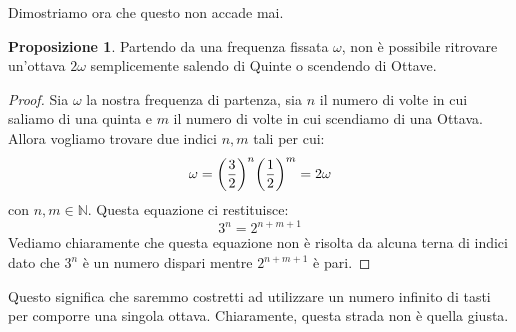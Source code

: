 \documentclass[12pt,a4paper]{book}
\theoremstyle{definition}
\theoremstyle{Theorem}
\newtheorem{Prop}[Def]{Proposizione}
\theoremstyle{definition}
\theoremstyle{definition}
\theoremstyle{definition}
\begin{document}
	Dimostriamo ora che questo non accade mai.
	\\
	 \begin{Prop}
	 	Partendo da una frequenza fissata $\omega$, non è possibile ritrovare un'ottava $2\omega$ semplicemente salendo di Quinte o scendendo di Ottave.
	 \end{Prop}
	 \begin{proof}
	 	Sia $\omega$ la nostra frequenza di partenza, sia $n$ il numero di volte in cui saliamo di una quinta e $m$ il numero di volte in cui scendiamo di una Ottava. Allora vogliamo trovare due indici $n,m$ tali per cui:
	 	$$\omega=\bigg({3\over 2}\bigg)^n\bigg({1\over 2}\bigg)^m=2\omega$$
	 	con $n,m\in \mathbb{N}$. Questa equazione ci restituisce:
	 	$$3^n=2^{n+m+1}$$
	 	Vediamo chiaramente che questa equazione non è risolta da alcuna terna di indici dato che $3^n$ è un numero dispari mentre $2^{n+m+1}$ è pari.
	 \end{proof}
	 Questo significa che saremmo costretti ad utilizzare un numero infinito di tasti per comporre una singola ottava. Chiaramente, questa strada non è quella giusta.
\end{document}
